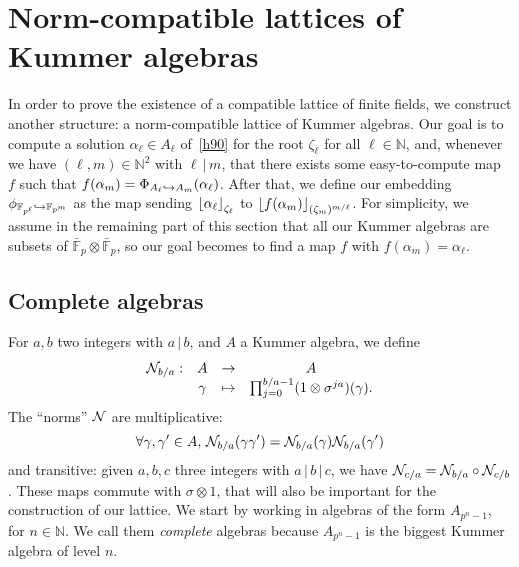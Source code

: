 \documentclass{sig-alternate}
\begin{document}
\section{Norm-compatible lattices of Kummer algebras}
\label{sec:lattices}

In order to prove the existence of a compatible lattice of finite fields,
we construct another structure: a norm-compatible lattice of
Kummer algebras. Our goal is to compute a solution $\alpha_\ell\in A_\ell$
of~\eqref{h90} for the root $\zeta_\ell$ for all $\ell\in\mathbb{N}$, and,
whenever we have $(\ell, m)\in\mathbb{N}^2$ with $\ell\,|\,m$, that there exists
some easy-to-compute map $f$ such that $f(\alpha_m) =
\Phi_{A_{\ell}\hookrightarrow A_{m}}(\alpha_\ell)$. After that, we define our embedding
$\phi_{\mathbb{F}_{p^{\ell}}\hookrightarrow\mathbb{F}_{p^{m}}}$ as the map sending $\left\lfloor \alpha_\ell \right\rfloor_{\zeta_\ell}$ to
$\left\lfloor f(\alpha_m) \right\rfloor_{(\zeta_m)^{m/\ell}}$. For simplicity, we assume in the
remaining part of this section that all our Kummer algebras are subsets of
$\bar{\mathbb{F}}_{p}\otimes\bar{\mathbb{F}}_p$, so our goal becomes to find a map
$f$ with $f(\alpha_m) = \alpha_\ell$.

\subsection{Complete algebras}

For $a, b$ two integers with $a\,|\,b$, and $A$ a Kummer
algebra, we define
\[
\begin{array}{cccc}
  \mathcal{N}_{b/a}: & A & \to & A \\
  & \gamma & \mapsto & \prod_{j=0}^{b/a-1} (1 \otimes
  \sigma^{ja})(\gamma).
\end{array}
\]
The ``norms'' $\mathcal{N}$ are multiplicative:
\[
  \forall\gamma, \gamma'\in A,\,\mathcal{N}_{b/a}(\gamma\gamma')=\mathcal{N}_{b/a}(\gamma)\mathcal{N}_{b/a}(\gamma')
\]
and transitive: given $a, b, c$ three integers with
$a\,|\,b\,|\,c$, we have $\mathcal{N}_{c/a} = \mathcal{N}_{b/a}\circ\mathcal{N}_{c/b}$. These maps 
commute with $\sigma\otimes1$, that will also be important for the construction
of our lattice. We start by working in algebras of the form $A_{p^n-1}$, for
$n\in\mathbb{N}$. We call them \emph{complete} algebras because
$A_{p^n-1}$ is the biggest Kummer algebra of level $n$.
\end{document}
